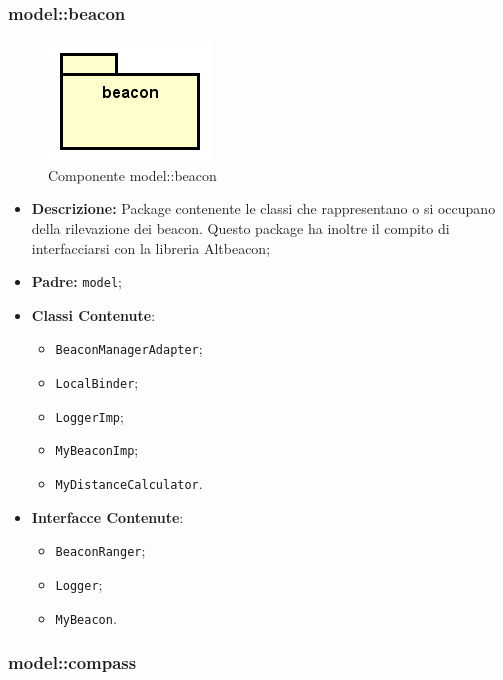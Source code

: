 \documentclass[../DefinizioneDiProdotto.tex]{subfiles}
\begin{document}
\subsubsection{model::\-beacon}

    \begin{figure}[H]
        \centering
        \includegraphics{img/package/beacon.png}
        \caption{Componente model::\-beacon}\label{fig:model::beacon} 
    \end{figure}
    \begin{itemize}
\item \textbf{Descrizione:} Package contenente le classi che rappresentano o si occupano della rilevazione dei beacon. Questo package ha inoltre il compito di interfacciarsi con la libreria Altbeacon;
\item \textbf{Padre:} \texttt{model};
\item \textbf{Classi Contenute}:
\begin{itemize}
\item \texttt{BeaconManagerAdapter};

\item \texttt{LocalBinder};

\item \texttt{LoggerImp};

\item \texttt{MyBeaconImp};

\item \texttt{MyDistanceCalculator}.

\end{itemize}
\item \textbf{Interfacce Contenute}:
\begin{itemize}
\item \texttt{BeaconRanger};

\item \texttt{Logger};

\item \texttt{MyBeacon}.

\end{itemize}
\end{itemize}

\subsubsection{model::\-compass}
\end{document}
